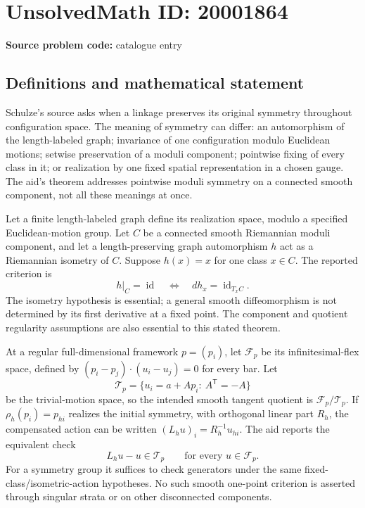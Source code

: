 \documentclass[11pt]{article}
\begin{document}
\section*{UnsolvedMath ID: 20001864}
\textbf{Source problem code:} catalogue entry
\subsection{Definitions and mathematical statement}
Schulze's source asks when a linkage preserves its original symmetry throughout configuration space. The meaning of symmetry can differ: an automorphism of the length-labeled graph; invariance of one configuration modulo Euclidean motions; setwise preservation of a moduli component; pointwise fixing of every class in it; or realization by one fixed spatial representation in a chosen gauge. The aid's theorem addresses pointwise moduli symmetry on a connected smooth component, not all these meanings at once.

Let a finite length-labeled graph define its realization space, modulo a specified Euclidean-motion group. Let \(C\) be a connected smooth Riemannian moduli component, and let a length-preserving graph automorphism \(h\) act as a Riemannian isometry of \(C\). Suppose \(h(x)=x\) for one class \(x\in C\). The reported criterion is
\[
 h|_C=\operatorname{id}\quad\Longleftrightarrow\quad
 dh_x=\operatorname{id}_{T_xC}.
\]
The isometry hypothesis is essential; a general smooth diffeomorphism is not determined by its first derivative at a fixed point. The component and quotient regularity assumptions are also essential to this stated theorem.

At a regular full-dimensional framework \(p=(p_i)\), let \(\mathcal F_p\) be its infinitesimal-flex space, defined by \((p_i-p_j)\cdot(u_i-u_j)=0\) for every bar. Let
\[
 \mathcal T_p=\{u_i=a+A p_i:\ A^{\mathsf T}=-A\}
\]
be the trivial-motion space, so the intended smooth tangent quotient is \(\mathcal F_p/\mathcal T_p\). If \(\rho_h(p_i)=p_{h i}\) realizes the initial symmetry, with orthogonal linear part \(R_h\), the compensated action can be written \((L_hu)_i=R_h^{-1}u_{h i}\). The aid reports the equivalent check
\[
 L_hu-u\in\mathcal T_p\qquad\text{for every }u\in\mathcal F_p.
\]
For a symmetry group it suffices to check generators under the same fixed-class/isometric-action hypotheses. No such smooth one-point criterion is asserted through singular strata or on other disconnected components.
\end{document}
